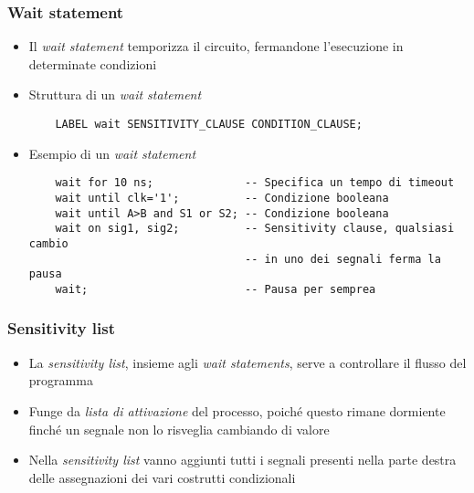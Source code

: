 \documentclass{article}
\begin{document}
\subsubsection{Wait statement}
\begin{itemize}
	\item Il \textit{wait statement} temporizza il circuito, fermandone l'esecuzione in determinate condizioni
	\item Struttura di un \textit{wait statement}
	      \begin{verbatim}
    LABEL wait SENSITIVITY_CLAUSE CONDITION_CLAUSE;
	      \end{verbatim}
	      
\newpage	      
	      
	\item Esempio di un \textit{wait statement}
	      \begin{verbatim}
    wait for 10 ns;              -- Specifica un tempo di timeout
    wait until clk='1';          -- Condizione booleana
    wait until A>B and S1 or S2; -- Condizione booleana
    wait on sig1, sig2;          -- Sensitivity clause, qualsiasi cambio
                                 -- in uno dei segnali ferma la pausa
    wait;                        -- Pausa per semprea
	      \end{verbatim} 
\end{itemize}
\subsubsection{Sensitivity list}
\begin{itemize}
	\item La \textit{sensitivity list}, insieme agli \textit{wait statements}, serve a controllare il flusso del programma
	\item Funge da \textit{lista di attivazione} del processo, poiché questo rimane dormiente finché un segnale non lo risveglia cambiando di valore
	\item Nella \textit{sensitivity list} vanno aggiunti tutti i segnali presenti nella parte destra delle assegnazioni dei vari costrutti condizionali
\end{itemize}
\end{document}
